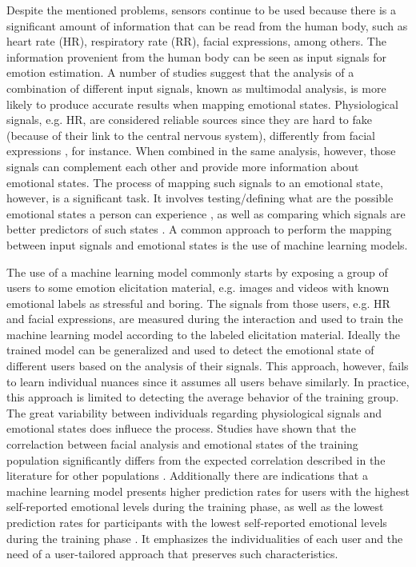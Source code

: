 Despite the mentioned problems, sensors continue to be used because there is a significant amount of information that can be read from the human body, such as heart rate (HR), respiratory rate (RR), facial expressions, among others. The information provenient from the human body can be seen as input signals for emotion estimation. A number of studies \parencite{kukolja2014comparative} suggest that the analysis of a combination of different input signals, known as multimodal analysis, is more likely to produce accurate results when mapping emotional states. Physiological signals, e.g. HR, are considered reliable sources since they are hard to fake (because of their link to the central nervous system), differently from facial expressions \parencite{Landowska}, for instance. When combined in the same analysis, however, those signals can complement each other and provide more information about emotional states. The process of mapping such signals to an emotional state, however, is a significant task. It involves testing/defining what are the possible emotional states a person can experience \parencite{mandryk2006continuous}, as well as comparing which signals are better predictors of such states \parencite{jerritta2011physiological}. A common approach to perform the mapping between input signals and emotional states is the use of machine learning models.

The use of a machine learning model commonly starts by exposing a group of users to some emotion elicitation material, e.g. images and videos with known emotional labels as stressful and boring. The signals from those users, e.g. HR and facial expressions, are measured during the interaction and used to train the machine learning model according to the labeled elicitation material. Ideally the trained model can be generalized and used to detect the emotional state of different users based on the analysis of their signals. This approach, however, fails to learn individual nuances since it assumes all users behave similarly. In practice, this approach is limited to detecting the average behavior of the training group. The great variability between individuals regarding physiological signals and emotional states does influece the process. Studies have shown that the correlaction between facial analysis and emotional states of the training population significantly differs from the expected correlation described in the literature for other populations \parencite{grafsgaard2013automatically}. Additionally there are indications that a machine learning model presents higher prediction rates for users with the highest self-reported emotional levels during the training phase, as well as the lowest prediction rates for participants with the lowest self-reported emotional levels during the training phase \parencite{mcduffcogcam}. It emphasizes the individualities of each user and the need of a user-tailored approach that preserves such characteristics.

